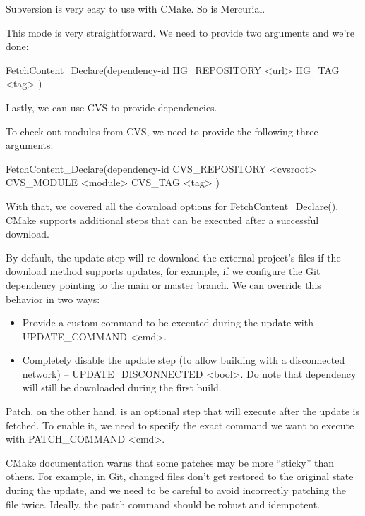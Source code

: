 Subversion is very easy to use with CMake. So is Mercurial.


This mode is very straightforward. We need to provide two arguments and we’re done:

\begin{shell}
FetchContent_Declare(dependency-id
                     HG_REPOSITORY <url>
                     HG_TAG <tag>
)
\end{shell}

Lastly, we can use CVS to provide dependencies.


To check out modules from CVS, we need to provide the following three arguments:

\begin{shell}
FetchContent_Declare(dependency-id
                     CVS_REPOSITORY <cvsroot>
                     CVS_MODULE <module>
                     CVS_TAG <tag>
)
\end{shell}

With that, we covered all the download options for FetchContent\_Declare(). CMake supports additional steps that can be executed after a successful download.


By default, the update step will re-download the external project’s files if the download method supports updates, for example, if we configure the Git dependency pointing to the main or master branch. We can override this behavior in two ways:

\begin{itemize}
\item
Provide a custom command to be executed during the update with UPDATE\_COMMAND <cmd>.

\item
Completely disable the update step (to allow building with a disconnected network) – UPDATE\_DISCONNECTED <bool>. Do note that dependency will still be downloaded during the first build.
\end{itemize}

Patch, on the other hand, is an optional step that will execute after the update is fetched. To enable it, we need to specify the exact command we want to execute with PATCH\_COMMAND <cmd>.

CMake documentation warns that some patches may be more “sticky” than others. For example, in Git, changed files don’t get restored to the original state during the update, and we need to be careful to avoid incorrectly patching the file twice. Ideally, the patch command should be robust and idempotent.

